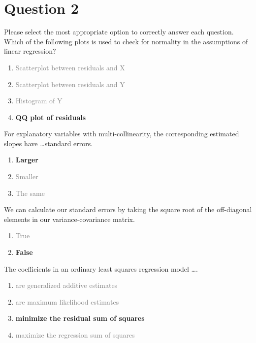 \documentclass[12pt,letterpaper]{article}
\begin{document}
\newpage

\section*{Question 2}
  \noindent Please select the most appropriate option to correctly answer each question.
Which of the following plots is used to check for normality in the assumptions of linear
regression?
  \begin{enumerate}
    \item \textcolor{gray}{Scatterplot between residuals and X}
    \item \textcolor{gray}{Scatterplot between residuals and Y}
    \item \textcolor{gray}{Histogram of Y}
    \item \textbf{QQ plot of residuals}
  \end{enumerate}

  \noindent For explanatory variables with multi-collinearity, the corresponding estimated slopes have %
  \ldots standard errors.
  \begin{enumerate}
    \item \textbf{Larger}
    \item \textcolor{gray}{Smaller}
    \item \textcolor{gray}{The same}
  \end{enumerate}


  \noindent We can calculate our standard errors by taking the square root of the off-diagonal elements in our variance-covariance matrix.
  \begin{enumerate}
    \item \textcolor{gray}{True}
    \item \textbf{False}
  \end{enumerate}

  \noindent The coefficients in an ordinary least squares regression model \ldots.
  \begin{enumerate}
    \item \textcolor{gray}{are generalized additive estimates}
    \item \textcolor{gray}{are maximum likelihood estimates}
    \item \textbf{minimize the residual sum of squares}
    \item \textcolor{gray}{maximize the regression sum of squares}
  \end{enumerate}
\end{document}
